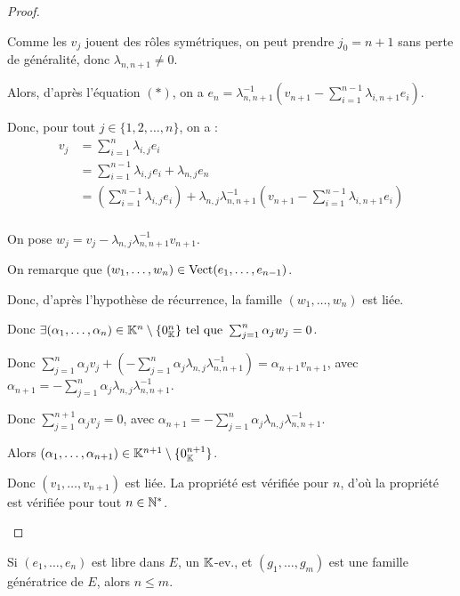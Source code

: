 \documentclass[12pt, a4paper]{report}
\begin{document}
\begin{proof}
\begin{outline}
        \1 Comme les $v_j$ jouent des rôles symétriques, on peut prendre $j_0 = n+1$ sans perte de généralité, donc $\lambda_{n,n+1} \ne 0$.

        \1 Alors, d'après l'équation $(*)$, on a $e_n = \lambda_{n,n+1}^{-1} \left(v_{n+1} - \sum_{i=1}^{n-1} \lambda_{i,n+1} e_i\right)$.

        \1 Donc, pour tout $j \in \{1,2,\dots,n\}$, on a :
        $$\begin{aligned}
v_j &= \sum_{i=1}^n \lambda_{i,j} e_i\\
&= \sum_{i=1}^{n-1} \lambda_{i,j} e_i + \lambda_{n,j} e_n\\
&= \left(\sum_{i=1}^{n-1} \lambda_{i,j} e_i\right) + \lambda_{n,j} \lambda_{n,n+1}^{-1} \left(v_{n+1} - \sum_{i=1}^{n-1} \lambda_{i,n+1} e_i\right)\\
\end{aligned}$$

    \1 On pose $w_j = v_j - \lambda_{n,j} \lambda_{n,n+1}^{-1} v_{n+1}$.

    \1 On remarque que $(w_1,\dots,w_n) \in \mathrm{Vect}(e_1,\dots,e_{n-1})$.

    \1 Donc, d'après l'hypothèse de récurrence, la famille $(w_1,\dots,w_n)$ est liée.

    \1 Donc $\exists (\alpha_1,\dots,\alpha_n) \in \mathbb{K}^n\setminus\{0_{\mathbb{K}}^n\} \text{ tel que } \sum_{j=1}^n \alpha_j w_j = 0$.

    \1 Donc $\sum_{j=1}^n \alpha_j v_j + \left(-\sum_{j=1}^n \alpha_j\lambda_{n,j} \lambda_{n,n+1}^{-1}\right) = \alpha_{n+1} v_{n+1}$, avec $\alpha_{n+1} = -\sum_{j=1}^n \alpha_j\lambda_{n,j} \lambda_{n,n+1}^{-1}$.

    \1 Donc $\sum_{j=1}^{n+1} \alpha_j v_j = 0$, avec $\alpha_{n+1} = -\sum_{j=1}^n \alpha_j\lambda_{n,j} \lambda_{n,n+1}^{-1}$.

    \1 Alors $(\alpha_1,\dots,\alpha_{n+1}) \in \mathbb{K}^{n+1}\setminus\{0_{\mathbb{K}}^{n+1}\}$.

    \1 Donc $(v_1,\dots,v_{n+1})$ est liée. La propriété est vérifiée pour $n$, d'où la propriété est vérifiée pour tout $n \in \mathbb{N}^*$.
    \end{outline}
\end{proof}

\begin{consequence}
    Si $(e_1,\dots,e_n)$ est libre dans $E$, un $\mathbb{K}$-ev., et $(g_1,\dots,g_{m})$ est une famille génératrice de $E$, alors $n \le m$.
\end{consequence}
\end{document}
